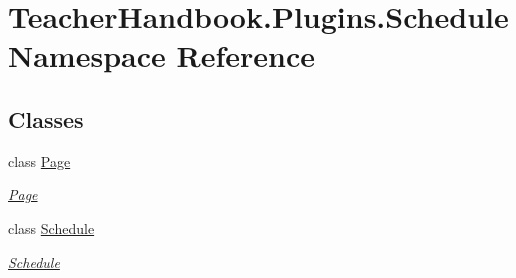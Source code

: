 \hypertarget{namespace_teacher_handbook_1_1_plugins_1_1_schedule}{}\section{Teacher\+Handbook.\+Plugins.\+Schedule Namespace Reference}
\label{namespace_teacher_handbook_1_1_plugins_1_1_schedule}
\subsection*{Classes}
\begin{DoxyCompactItemize}
\item 
class \mbox{\hyperlink{class_teacher_handbook_1_1_plugins_1_1_schedule_1_1_page}{Page}}
\begin{DoxyCompactList}\small\item\em \mbox{\hyperlink{class_teacher_handbook_1_1_plugins_1_1_schedule_1_1_page}{Page}} \end{DoxyCompactList}\item 
class \mbox{\hyperlink{class_teacher_handbook_1_1_plugins_1_1_schedule_1_1_schedule}{Schedule}}
\begin{DoxyCompactList}\small\item\em \mbox{\hyperlink{class_teacher_handbook_1_1_plugins_1_1_schedule_1_1_schedule}{Schedule}} \end{DoxyCompactList}\end{DoxyCompactItemize}
